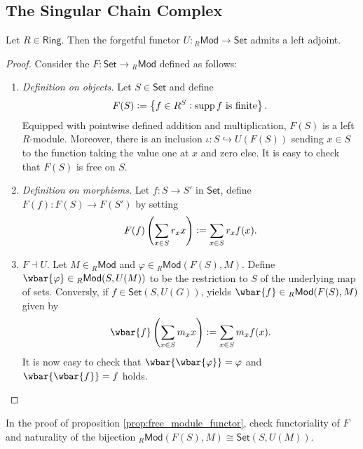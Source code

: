 \subsection*{The Singular Chain Complex}

\begin{proposition}
	\label{prop:free_module_functor}
	Let $R \in \mathsf{Ring}$. Then the forgetful functor $U : {_R}\mathsf{Mod} \to \mathsf{Set}$ admits a left adjoint.
\end{proposition}

\begin{proof}
	Consider the  $F: \mathsf{Set} \to {_R}\mathsf{Mod}$ defined as follows:
	\begin{enumerate}[label = \textit{Step \arabic*:},wide = 0pt]
		\item \textit{Definition on objects.} Let $S \in \mathsf{Set}$ and define 
			\begin{equation*}
				F(S) := \cbr[1]{f \in R^S : \supp f \text{ is finite}}.
			\end{equation*}
			Equipped with pointwise defined addition and multiplication, $F(S)$ is a left $R$-module. Moreover, there is an inclusion $\iota : S \hookrightarrow U(F(S))$ sending $x \in S$ to the function taking the value one at $x$ and zero else. It is easy to check that $F(S)$ is free on $S$.
		\item \textit{Definition on morphisms.} Let $f : S \to S'$ in $\mathsf{Set}$, define $F(f) : F(S) \to F(S')$ by setting 
			\begin{equation*}
				F(f)\del[4]{\sum_{x \in S}r_x x} := \sum_{x \in S}r_x f(x).
			\end{equation*}
		\item $F \dashv U$. Let $M \in {_R}\mathsf{Mod}$ and $\varphi \in {_R}\mathsf{Mod}(F(S), M)$. Define $\wbar{\varphi} \in {_R}\mathsf{Mod}(S,U(M))$ to be the restriction to $S$ of the underlying map of sets. Conversly, if $f \in \mathsf{Set}(S,U(G))$,  yields $\wbar{f} \in {_R}\mathsf{Mod}(F(S),M)$ given by
		\begin{equation*}
			\wbar{f}\del[4]{\sum_{x \in S} m_x x} := \sum_{x \in S} m_x f(x).
		\end{equation*}
		It is now easy to check that $\wbar{\wbar{\varphi}} = \varphi$ and $\wbar{\wbar{f}} = f$ holds. 
	\end{enumerate}	
\end{proof}

\begin{exercise}
	In the proof of proposition \ref{prop:free_module_functor}, check functoriality of $F$ and naturality of the bijection ${_R}\mathsf{Mod}(F(S),M) \cong \mathsf{Set}(S,U(M))$.
\end{exercise}

